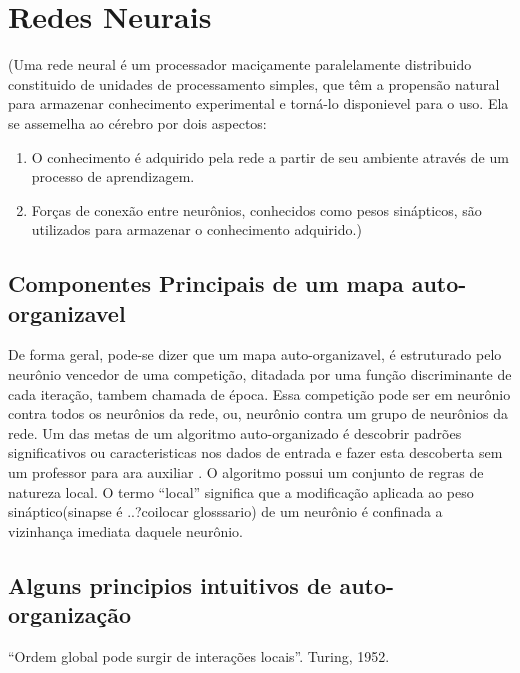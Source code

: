 \chapter{Redes Neurais}
\quad  (Uma rede neural é um processador maciçamente paralelamente distribuido constituido de unidades de processamento simples, que têm a propensão natural para  armazenar conhecimento experimental e torná-lo disponievel para o uso. Ela se assemelha ao cérebro por dois aspectos:
\begin {enumerate}
	\item O conhecimento é adquirido pela rede a partir de seu ambiente através de um processo de aprendizagem.
	\item	Forças de conexão entre neurônios, conhecidos como pesos sinápticos, são utilizados para armazenar o conhecimento adquirido.)
\end{enumerate}

\section {Componentes Principais de um mapa auto-organizavel}

\quad  De forma geral, pode-se dizer que um mapa auto-organizavel, é estruturado pelo neurônio vencedor de uma competição, ditadada por uma função discriminante de cada iteração, tambem chamada de época. Essa competição pode ser em neurônio contra todos os neurônios da rede, ou, neurônio contra um grupo de neurônios da rede. Um das metas de um algoritmo auto-organizado é descobrir padrões significativos ou caracteristicas nos dados de entrada e fazer esta descoberta  sem um professor para ara auxiliar . O algoritmo possui um conjunto de regras de natureza local. O termo “local” significa que a modificação aplicada ao peso sináptico(sinapse é ..?coilocar glosssario) de um neurônio é confinada a vizinhança imediata daquele neurônio.

\section { Alguns principios intuitivos de auto-organização}

\quad “Ordem global pode surgir de interações locais”. Turing, 1952.

